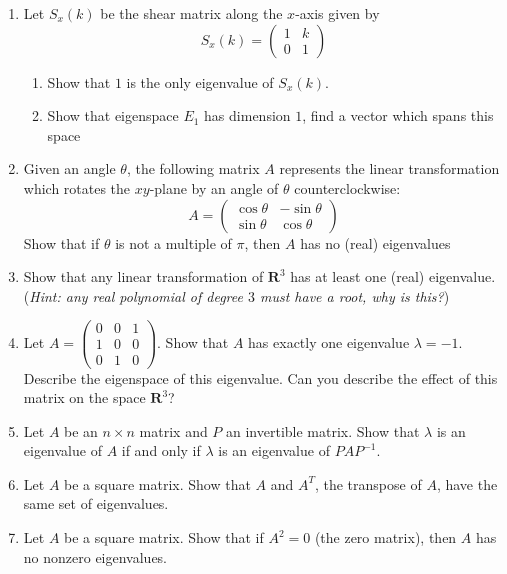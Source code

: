 \documentclass[12pt]{article}
\numberwithin{equation}{subsection}
\numberwithin{figure}{subsection}
\theoremstyle{note}
\begin{document}
\begin{enumerate}[label=\arabic*.]
	\item Let $S_x(k)$ be the shear matrix along the $x$-axis given by \[S_x(k)= \begin{pmatrix} 1& k\\ 0 & 1\end{pmatrix} \]
	\begin{enumerate}
		\item Show that $1$ is the only eigenvalue of $S_x(k)$.
		\item Show that eigenspace $E_1$ has dimension $1$, find a vector which spans this space
	\end{enumerate}
	\item \label{rotation-matrices} Given an angle $\theta$, the following matrix $A$ represents the linear transformation which rotates the $xy$-plane by an angle of $\theta$ counterclockwise: \[A=\begin{pmatrix} \cos \theta & -\sin\theta \\ \sin\theta & \cos \theta \end{pmatrix}\] Show that if $\theta$ is not a multiple of $\pi$, then  $A$ has no (real) eigenvalues
	\item \label{princ-axis} Show that any linear transformation of $\mathbf{R}^3$ has at least one (real) eigenvalue. (\textit{Hint: any real polynomial of degree $3$ must have a root, why is this?})
	
	\item Let $A=\begin{pmatrix} 0 & 0 & 1 \\ 1 & 0 & 0 \\ 0 & 1 & 0 \end{pmatrix}$. Show that $A$ has exactly one eigenvalue $\lambda=-1$. Describe the eigenspace of this eigenvalue. Can you describe the effect of this matrix on the space $\mathbf{R}^3$?
	\item Let $A$ be an $n\times n$ matrix and $P$ an invertible matrix. Show that $\lambda$ is an eigenvalue of $A$ if and only if $\lambda$ is an eigenvalue of $PAP^{-1}$.
	
	\item \label{ex-transpote} Let $A$ be a square matrix. Show that $A$ and $A^T$, the transpose of $A$, have the same set of eigenvalues. 
	
	\item Let $A$ be a square matrix. Show that if $A^2=0$ (the zero matrix), then $A$ has no nonzero eigenvalues. 
	

\end{enumerate}
\end{document}
